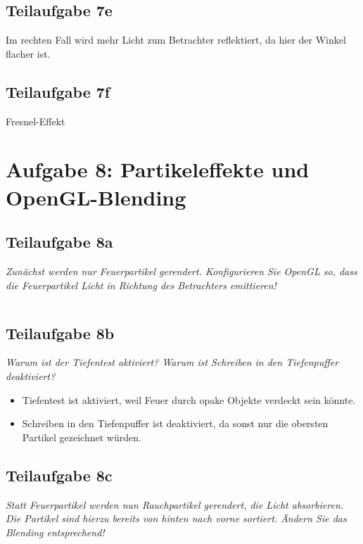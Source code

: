 \documentclass[a4paper]{scrartcl}
\begin{document}
\subsection*{Teilaufgabe 7e}
Im rechten Fall wird mehr Licht zum Betrachter reflektiert, da hier der Winkel flacher ist.

\subsection*{Teilaufgabe 7f}
Fresnel-Effekt

\clearpage
\section*{Aufgabe 8: Partikeleffekte und OpenGL-Blending}
\subsection*{Teilaufgabe 8a}
\textit{Zunächst werden nur Feuerpartikel gerendert. Konfigurieren Sie OpenGL
so, dass die Feuerpartikel Licht in Richtung des Betrachters emittieren!}

\inputminted[linenos, numbersep=5pt, tabsize=4, frame=lines, label=8a.cpp]{cpp}{8a.cpp}

\subsection*{Teilaufgabe 8b}
\textit{Warum ist der Tiefentest aktiviert? Warum ist Schreiben in den
Tiefenpuffer deaktiviert?}

\begin{itemize}
    \item Tiefentest ist aktiviert, weil Feuer durch opake Objekte verdeckt sein könnte.
    \item Schreiben in den Tiefenpuffer ist deaktiviert, da sonst nur die obersten Partikel gezeichnet würden.
\end{itemize}


\subsection*{Teilaufgabe 8c}
\textit{Statt Feuerpartikel werden nun Rauchpartikel gerendert, die Licht
absorbieren. Die Partikel sind hierzu bereits von hinten nach vorne sortiert.
Ändern Sie das Blending entsprechend!}

\inputminted[linenos, numbersep=5pt, tabsize=4, frame=lines, label=8c.cpp]{cpp}{8c.cpp}
\end{document}
